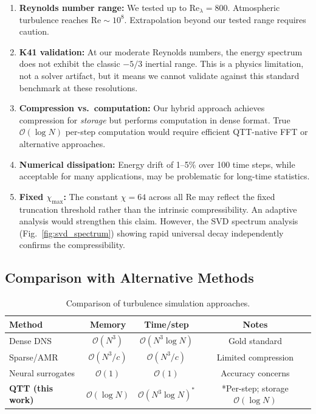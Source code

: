 \documentclass[preprint,12pt,authoryear]{elsarticle}
\newcommand{\bigO}{\mathcal{O}}
\theoremstyle{definition}
\begin{document}
\begin{enumerate}
    \item \textbf{Reynolds number range:} We tested up to $\mathrm{Re}_\lambda = 800$.  Atmospheric turbulence reaches $\mathrm{Re} \sim 10^8$.  Extrapolation beyond our tested range requires caution.
    
    \item \textbf{K41 validation:} At our moderate Reynolds numbers, the energy spectrum does not exhibit the classic $-5/3$ inertial range.  This is a physics limitation, not a solver artifact, but it means we cannot validate against this standard benchmark at these resolutions.
    
    \item \textbf{Compression vs.\ computation:} Our hybrid approach achieves compression for \emph{storage} but performs computation in dense format.  True $\bigO(\log N)$ per-step computation would require efficient QTT-native FFT or alternative approaches.
    
    \item \textbf{Numerical dissipation:} Energy drift of 1--5\% over 100 time steps, while acceptable for many applications, may be problematic for long-time statistics.
    
    \item \textbf{Fixed $\chi_{\max}$:} The constant $\chi = 64$ across all Re may reflect the fixed truncation threshold rather than the intrinsic compressibility.  An adaptive analysis would strengthen this claim.  However, the SVD spectrum analysis (Fig.~\ref{fig:svd_spectrum}) showing rapid universal decay independently confirms the compressibility.
\end{enumerate}

\subsection{Comparison with Alternative Methods}

\begin{table}[htbp]
\centering
\caption{Comparison of turbulence simulation approaches.}
\label{tab:comparison}
\begin{tabular}{lccc}
\toprule
Method & Memory & Time/step & Notes \\
\midrule
Dense DNS & $\bigO(N^3)$ & $\bigO(N^3 \log N)$ & Gold standard \\
Sparse/AMR & $\bigO(N^3/c)$ & $\bigO(N^3/c)$ & Limited compression \\
Neural surrogates & $\bigO(1)$ & $\bigO(1)$ & Accuracy concerns \\
\textbf{QTT (this work)} & $\bigO(\log N)$ & $\bigO(N^3 \log N)^*$ & *Per-step; storage $\bigO(\log N)$ \\
\bottomrule
\end{tabular}
\end{table}
\end{document}
